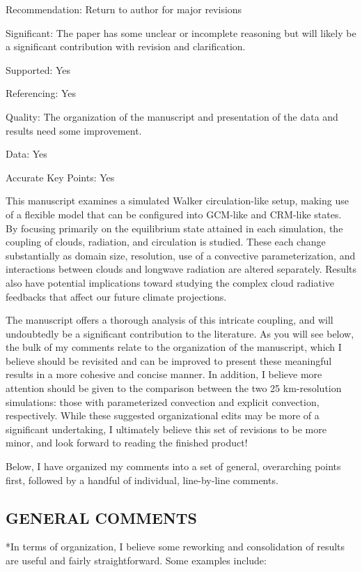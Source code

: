 \documentclass[draft]{agujournal2019}
\begin{document}
Recommendation: Return to author for major revisions

Significant: The paper has some unclear or incomplete reasoning but will likely be a significant contribution with revision and clarification.

Supported: Yes

Referencing: Yes

Quality: The organization of the manuscript and presentation of the data and results need some improvement.

Data: Yes

Accurate Key Points: Yes

This manuscript examines a simulated Walker circulation-like setup, making use of a flexible model that can be configured into GCM-like and CRM-like states. By focusing primarily on the equilibrium state attained in each simulation, the coupling of clouds, radiation, and circulation is studied. These each change substantially as domain size, resolution, use of a convective parameterization, and interactions between clouds and longwave radiation are altered separately. Results also have potential implications toward studying the complex cloud radiative feedbacks that affect our future climate projections.

The manuscript offers a thorough analysis of this intricate coupling, and will undoubtedly be a significant contribution to the literature. As you will see below, the bulk of my comments relate to the organization of the manuscript, which I believe should be revisited and can be improved to present these meaningful results in a more cohesive and concise manner. In addition, I believe more attention should be given to the comparison between the two 25 km-resolution simulations: those with parameterized convection and explicit convection, respectively. While these suggested organizational edits may be more of a significant undertaking, I ultimately believe this set of revisions to be more minor, and look forward to reading the finished product!

Below, I have organized my comments into a set of general, overarching points first, followed by a handful of individual, line-by-line comments.

\subsection{GENERAL COMMENTS}
*In terms of organization, I believe some reworking and consolidation of results are useful and fairly straightforward. Some examples include:
\end{document}
